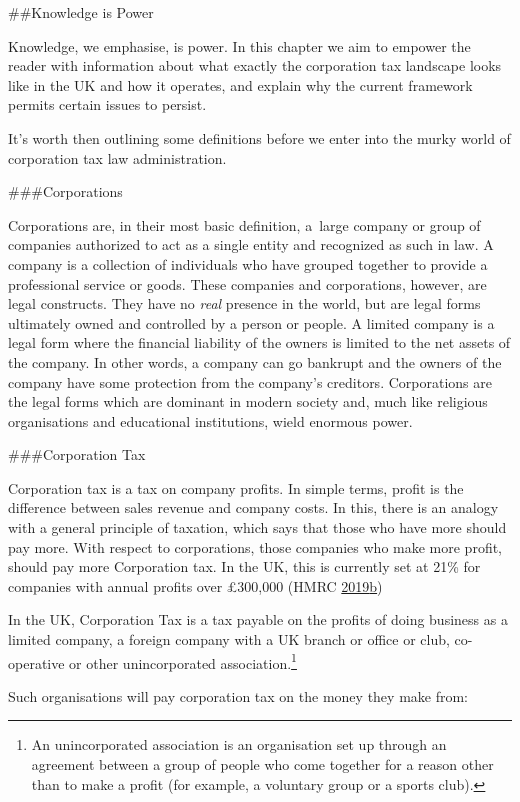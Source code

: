 \documentclass[]{tufte-handout}
\begin{document}
\#\#Knowledge is Power

Knowledge, we emphasise, is power. In this chapter we aim to empower the
reader with information about what exactly the corporation tax landscape
looks like in the UK and how it operates, and explain why the current
framework permits certain issues to persist.

It's worth then outlining some definitions before we enter into the
murky world of corporation tax law administration.

\#\#\#Corporations

Corporations are, in their most basic definition, a~large company or
group of companies authorized to act as a single entity and recognized
as such in law. A company is a collection of individuals who have
grouped together to provide a professional service or goods. These
companies and corporations, however, are legal constructs. They have no
\emph{real} presence in the world, but are legal forms ultimately owned
and controlled by a person or people. A limited company is a legal form
where the financial liability of the owners is limited to the net assets
of the company. In other words, a company can go bankrupt and the owners
of the company have some protection from the company's creditors.
Corporations are the legal forms which are dominant in modern society
and, much like religious organisations and educational institutions,
wield enormous power.

\#\#\#Corporation Tax

Corporation tax is a tax on company profits. In simple terms, profit is
the difference between sales revenue and company costs. In this, there
is an analogy with a general principle of taxation, which says that
those who have more should pay more. With respect to corporations, those
companies who make more profit, should pay more Corporation tax. In the
UK, this is currently set at 21\% for companies with annual profits over
£300,000 (HMRC
\protect\hyperlink{ref-HMRC2019a}{2019}\protect\hyperlink{ref-HMRC2019a}{b})

In the UK, Corporation Tax is a tax payable on the profits of doing
business as a limited company, a foreign company with a UK branch or
office or club, co-operative or other unincorporated
association.\footnote{An unincorporated association is an organisation
  set up through an agreement between a group of people who come
  together for a reason other than to make a profit (for example, a
  voluntary group or a sports club).}

Such organisations will pay corporation tax on the money they make from:
\end{document}
